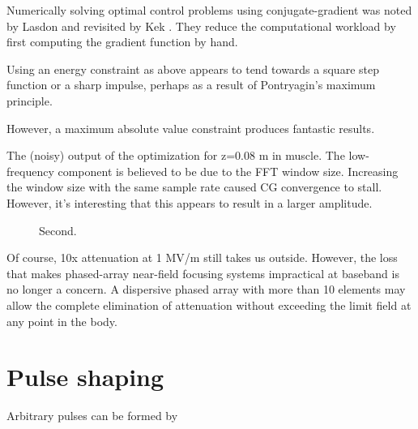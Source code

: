 \documentclass[paper.tex]{subfiles}
\begin{document}
Numerically solving optimal control problems using conjugate-gradient was noted by Lasdon \cite{conjugate1967} and 
revisited by Kek \cite{Conjugate}. They reduce the computational workload by first computing the 
gradient function by hand.

Using an energy constraint as above appears to tend towards a square step function or a sharp impulse, perhaps as a result of Pontryagin's maximum principle\cite{Optimum1964}.

However, a maximum absolute value constraint produces fantastic results.


\begin{figure}[H]
	
	\caption{}
\end{figure}


The (noisy) output of the optimization for z=0.08 m in muscle. The low-frequency component is believed to be due to the FFT window size. Increasing the window size with the same sample rate caused CG convergence to stall. However, it's interesting that this appears to result in a larger amplitude. 


\begin{figure}[H]
	
	\caption{Second.}
\end{figure}



Of course, 10x attenuation at 1 MV/m still takes us outside. However, the loss that makes phased-array near-field focusing systems impractical at baseband is no longer a concern. A dispersive phased array with more than 10 elements may allow the complete elimination of attenuation without exceeding the limit field at any point in the body. 


\section{Pulse shaping}


Arbitrary pulses can be formed by 
\end{document}

